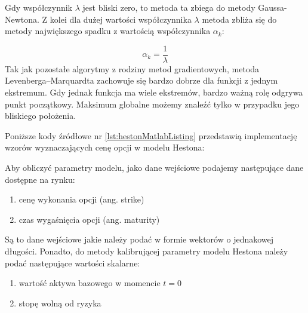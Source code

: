 \documentclass{pracamgr}
\begin{document}
Gdy współczynnik $\lambda$ jest bliski zero, to metoda ta zbiega do metody Gaussa-Newtona. 
Z kolei dla dużej wartości współczynnika $\lambda$ metoda zbliża się do metody największego spadku
z wartością współczynnika $\alpha_k$:

\begin{equation}
  \alpha_k = \frac{1}{\lambda}
\end{equation}
Tak jak pozostałe algorytmy z rodziny metod gradientowych, metoda Levenberga–Marquardta zachowuje się
bardzo dobrze dla funkcji z jednym ekstremum. Gdy jednak funkcja ma wiele ekstremów, bardzo ważną
rolę odgrywa punkt początkowy. Maksimum globalne możemy znaleźć tylko w przypadku jego bliskiego
położenia.

Poniższe kody źródłowe nr \ref{lst:hestonMatlabListing}\cite{HestonMatlab} przedstawią
implementację wzorów wyznaczających cenę opcji w modelu Hestona:






Aby obliczyć parametry modelu, jako dane wejściowe podajemy następujące dane dostępne na rynku:
\begin{enumerate}
  \item cenę wykonania opcji (ang. strike)
  \item czas wygaśnięcia opcji (ang. maturity)
\end{enumerate}
Są to dane wejściowe jakie należy podać w formie wektorów o jednakowej długości.
Ponadto, do metody kalibrującej parametry modelu Hestona należy podać następujące 
wartości skalarne:
\begin{enumerate}
  \item wartość aktywa bazowego w momencie $t=0$
  \item stopę wolną od ryzyka
\end{enumerate}
\end{document}
